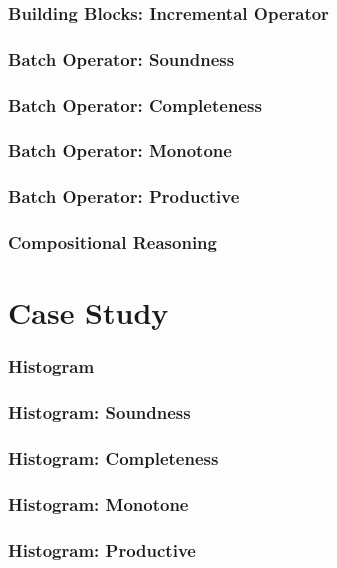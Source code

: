 \documentclass[aspectratio=169,10pt]{beamer}
\begin{document}
\begin{frame}[fragile]
  \frametitle{Building Blocks: Incremental Operator}

\end{frame}

\begin{frame}[fragile]
  \frametitle{Batch Operator: Soundness}

\end{frame}

\begin{frame}[fragile]
  \frametitle{Batch Operator: Completeness}

\end{frame}

\begin{frame}[fragile]
  \frametitle{Batch Operator: Monotone}

\end{frame}

\begin{frame}[fragile]
  \frametitle{Batch Operator: Productive}

\end{frame}

\begin{frame}[fragile]
  \frametitle{Compositional Reasoning}

\end{frame}

\section{Case Study}

\begin{frame}
  \frametitle{Histogram}
\end{frame}

\begin{frame}
  \frametitle{Histogram: Soundness}

\end{frame}

\begin{frame}
  \frametitle{Histogram: Completeness}
\end{frame}

\begin{frame}
  \frametitle{Histogram: Monotone}
\end{frame}

\begin{frame}
  \frametitle{Histogram: Productive}
\end{frame}
\end{document}
